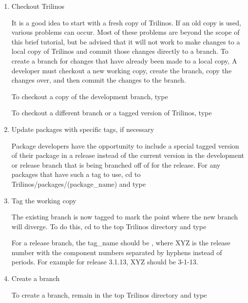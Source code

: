 \documentclass[12pt,relax]{TrilinosDevGuide}
\begin{document}
\begin{enumerate}
\item Checkout Trilinos

It is a good idea to start with a fresh copy of Trilinos.  If an old copy is 
used, various problems can occur.  Most of these problems are beyond the scope 
of this brief tutorial, but be advised that it will not work to make changes 
to a local copy of Trilinos and commit those changes directly to 
a branch.  To create a branch for changes that have already been made to a 
local copy, A developer must checkout a new working copy, create the branch, 
copy the changes over, and then commit the changes to the branch.  

To checkout a copy of the development branch, type


To checkout a different branch or a tagged version of Trilinos, type


\item Update packages with specific tags, if necessary

Package developers have the opportunity to include a special tagged version of 
their package in a release instead of the current version in the 
development or release branch that is being branched off of for the release.  
For any packages that have such a tag to use, cd to 
Trilinos/packages/(package\_name) and type


\item Tag the working copy

The existing branch is now tagged to mark the point where the new branch 
will diverge.  To do this, cd to the top Trilinos 
directory and type


For a release branch, the tag\_name should be 
, where XYZ is the 
release number with the component numbers separated by hyphens instead of 
periods.  For example for release 3.1.13, XYZ should be 3-1-13.

\item Create a branch

To create a branch, remain in the top Trilinos directory and type



\end{enumerate}
\end{document}
